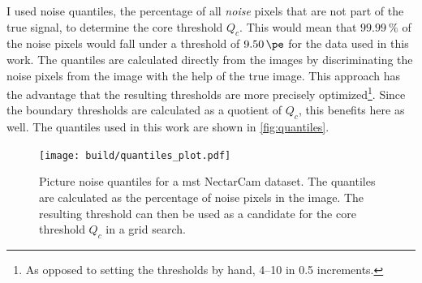 I used noise quantiles, \ie the percentage of all \textit{noise} pixels that are not part of the true signal,
to determine the core threshold \(Q_c\). This would mean that \eg \(\SI{99.99}{\percent}\)
of the noise pixels would fall under a threshold of \(\SI{9.50}{\pe}\) for the data used in this work. The quantiles are calculated directly from the images by
discriminating the noise pixels from the image with the help of the true image. This approach has the
advantage that the resulting thresholds are more precisely optimized\footnote{As opposed to setting the thresholds by hand, \eg \numrange{4}{10} in \num{0.5} increments.}.
Since the boundary thresholds are calculated as a quotient of \(Q_c\), this benefits here as well.
The quantiles used in this work are shown in \autoref{fig:quantiles}.
\begin{figure}
    \centering
    \texttt{[image: build/quantiles\_plot.pdf]}
    \caption{Picture noise quantiles for a \gls{mst} NectarCam dataset. The quantiles are calculated
    as the percentage of noise pixels in the image. The resulting threshold can then be used as a
    candidate for the core threshold \(Q_c\) in a grid search.}%
    \label{fig:quantiles}
    \vspace{-0.5cm}
\end{figure}

